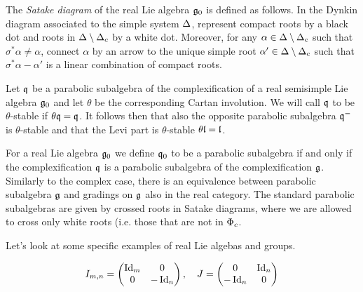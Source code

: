 The \emph{Satake diagram} of the real Lie algebra $\mathfrak{g}_0$ is defined as follows. In the Dynkin diagram associated to the simple system $\Delta$, represent compact roots by a black dot and roots in $\Delta\setminus\Delta_c$ by a white dot. Moreover, for any $\alpha\in\Delta\setminus\Delta_c$ such that $\sigma^*\alpha\neq\alpha$, connect $\alpha$ by an arrow  to the unique simple root $\alpha'\in\Delta\setminus\Delta_c$ such that $\sigma^*\alpha -\alpha'$ is a linear combination of compact roots.




\begin{definition}
 Let $\mathfrak{q}$ be a parabolic subalgebra of the complexification of a real semisimple Lie algebra $\mathfrak{g}_0$ and let $\theta$ be the corresponding Cartan involution. We will call $\mathfrak{q}$ to be $\theta$-stable if $\theta \mathfrak{q} = \mathfrak{q}$. It follows then that also the opposite parabolic subalgebra $\mathfrak{q}^-$ is $\theta$-stable and that the Levi part is $\theta$-stable $\theta \mathfrak{l} = \mathfrak{l}$.
\end{definition}

For a real Lie algebra $\mathfrak{g}_0$ we define $\mathfrak{q}_0$ to be a parabolic subalgebra if and only if the complexification $\mathfrak{q}$ is a parabolic subalgebra of the complexification $\mathfrak{g}$. Similarly to the complex case, there is an equivalence between parabolic subalgebra $\mathfrak{g}$ and gradings on $\mathfrak{g}$ also in the real category. The standard parabolic subalgebras are given by crossed roots in Satake diagrams, where we are allowed to cross only white roots (i.e. those that are not in $\Phi_c$.


Let's look at some specific examples of real Lie algebas and groups.

\[
 I_{m,n} = \begin{pmatrix} \operatorname{\mathrm{Id}}_m & 0 \\ 0 & -\operatorname{\mathrm{Id}}_n \end{pmatrix}, \quad J = \begin{pmatrix} 0 & \operatorname{\mathrm{Id}}_n \\ -\operatorname{\mathrm{Id}}_n & 0 \end{pmatrix}
\]

